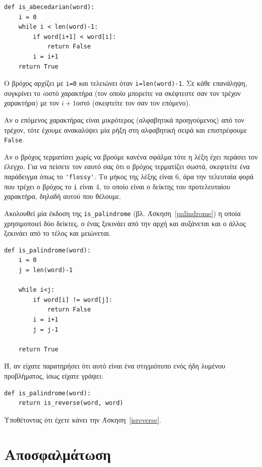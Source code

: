 \documentclass[10pt]{book}
\begin{document}
\begin{verbatim}
def is_abecedarian(word):
    i = 0
    while i < len(word)-1:
        if word[i+1] < word[i]:
            return False
        i = i+1
    return True
\end{verbatim}
%

Ο βρόχος αρχίζει με {\tt i=0} και τελειώνει όταν {\tt i=len(word)-1}. 
Σε κάθε επανάληψη, συγκρίνει το $i$οστό χαρακτήρα (τον οποίο μπορείτε να σκέφτεστε σαν τον τρέχον χαρακτήρα) με τον $i+1$οστό (σκεφτείτε τον σαν τον επόμενο).

Αν ο επόμενος χαρακτήρας είναι μικρότερος (αλφαβητικά προηγούμενος) από τον τρέχον, τότε έχουμε ανακαλύψει μία ρήξη στη αλφαβητική σειρά και επιστρέφουμε {\tt False}.

Αν ο βρόχος τερματίσει χωρίς να βρούμε κανένα σφάλμα τότε η λέξη έχει περάσει τον έλεγχο. Για να πείσετε τον εαυτό σας ότι ο βρόχος τερματίζει σωστά, σκεφτείτε ένα παράδειγμα όπως το \verb"'flossy'". Το μήκος της λέξης είναι 6, άρα την τελευταία φορά που τρέχει ο βρόχος το {\tt i} είναι 4, το οποίο είναι ο δείκτης του προτελευταίου χαρακτήρα, δηλαδή αυτού που θέλουμε.

Ακολουθεί μία έκδοση της \verb"is_palindrome" (βλ. Άσκηση~\ref{palindrome}) η οποία χρησιμοποιεί δύο δείκτες, ο ένας ξεκινάει από την αρχή και αυξάνεται και ο άλλος ξεκινάει από το τέλος και μειώνεται.


\begin{verbatim}
def is_palindrome(word):
    i = 0
    j = len(word)-1
    
    while i<j:
        if word[i] != word[j]:
            return False
        i = i+1
        j = j-1

    return True
\end{verbatim}


Ή, αν είχατε παρατηρήσει ότι αυτό είναι ένα στιγμιότυπο ενός ήδη λυμένου προβλήματος, ίσως είχατε γράψει:

\begin{verbatim}
def is_palindrome(word):
    return is_reverse(word, word)
\end{verbatim}

Υποθέτοντας ότι έχετε κάνει την Άσκηση~\ref{isreverse}.



\section{Αποσφαλμάτωση}
\end{document}
